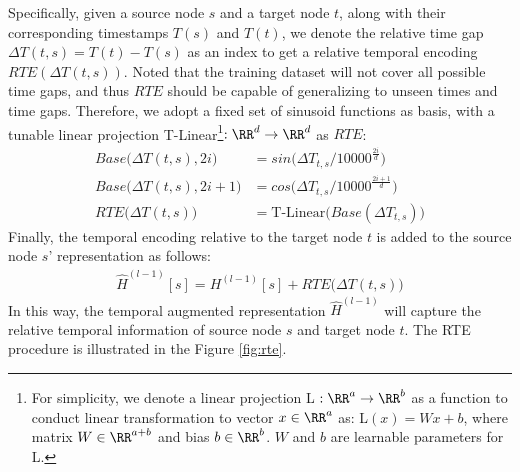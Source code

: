 \documentclass[sigconf]{acmart}
\theoremstyle{definition}
\begin{document}
Specifically, given a source node $s$ and a target node $t$, along with their corresponding timestamps $T(s)$ and $T(t)$, we denote the relative time gap $\Delta T(t,s) = T(t) - T(s)$ as an index to get a relative temporal encoding $RTE(\Delta T(t,s))$. 
Noted that the training dataset will not cover all possible time gaps, and thus  $RTE$ should be capable of generalizing to unseen times and time gaps. 
Therefore, we adopt a fixed set of sinusoid functions as basis, with a tunable linear projection T-Linear\footnote{For simplicity, we denote a linear projection L $:\RR^{a}\rightarrow \RR^{b}$ as a function to conduct linear transformation to vector $x\in\RR^{a}$ as: L$(x)=Wx+b$, where matrix $W\in\RR^{a+b}$ and bias $b\in\RR^{b}$. $W$ and $b$ are learnable parameters for L.}$: \RR^{d} \rightarrow \RR^{d}$ as $RTE$:
\begin{align}
   Base\big(\Delta T(t,s), 2i\big) & = sin\Big(\Delta T_{t,s} / 10000^{\frac{2i}{d}}\Big)\\ 
   Base\big(\Delta T(t,s), 2i+1\big) & = cos\Big(\Delta T_{t,s} / 10000^{\frac{2i+1}{d}}\Big)\\ 
   RTE\big(\Delta T(t,s)\big) & = \text{T-Linear}\Big( Base(\Delta T_{t,s}) \Big)
\end{align}
Finally, the temporal encoding relative to the target node $t$ is added to the source node $s$' representation as follows:
\begin{align}
    \widehat{H}^{(l-1)}[s] = H^{(l-1)}[s] + RTE\big(\Delta T(t,s)\big)
\end{align}
In this way, the temporal augmented representation $\widehat{H}^{(l-1)}$ will capture the relative temporal information of source node $s$ and target node $t$. The RTE procedure is illustrated in the Figure \ref{fig:rte}. 
\end{document}
